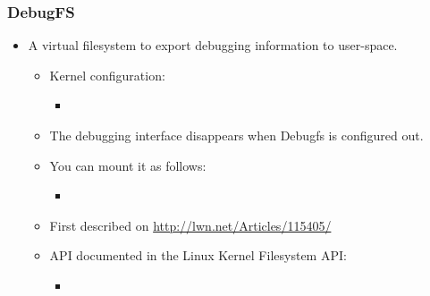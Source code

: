 \begin{frame}
  \frametitle{DebugFS}
  \begin{itemize}
  \item A virtual filesystem to export debugging information to
    user-space.
    \begin{itemize}
    \item Kernel configuration: 
      \begin{itemize}
      \item {}
      \end{itemize}
    \item The debugging interface disappears when Debugfs is
      configured out.
    \item You can mount it as follows:
      \begin{itemize}
      \item {}
      \end{itemize}
    \item First described on \url{http://lwn.net/Articles/115405/}
    \item API documented in the Linux Kernel Filesystem API:
      \begin{itemize}
      \item {}
      \end{itemize}
    \end{itemize}
  \end{itemize}
\end{frame}

